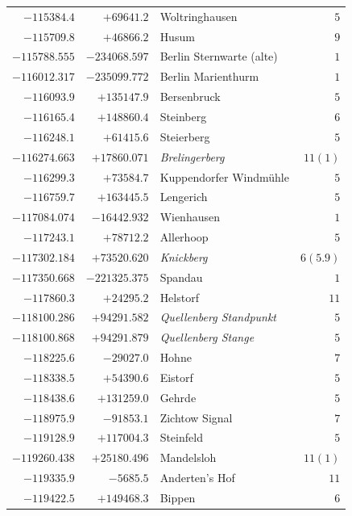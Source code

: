 \begin{center}
\begin{tabular}{r|r|p{170pt}|r}
\(-115384.4\)&\(+69641.2\)&Woltringhausen&\(5\)\\
\(-115709.8\)&\(+46866.2\)&Husum&\(9\)\\
\(-115788.555\)&\(-234068.597\)&Berlin Sternwarte (alte)&\(1\)\\
\(-116012.317\)&\(-235099.772\)&Berlin Marienthurm&\(1\)\\
\(-116093.9\)&\(+135147.9\)&Bersenbruck&\(5\)\\
\(-116165.4\)&\(+148860.4\)&Steinberg&\(6\)\\
\(-116248.1\)&\(+61415.6\)&Steierberg&\(5\)\\
\(-116274.663\)&\(+17860.071\)&\textit{Brelingerberg}&\(11 (1)\)\\
\(-116299.3\)&\(+73584.7\)&Kuppendorfer Windmühle&\(5\)\\
\(-116759.7\)&\(+163445.5\)&Lengerich&\(5\)\\
\(-117084.074\)&\(-16442.932\)&Wienhausen&\(1\)\\
\(-117243.1\)&\(+78712.2\)&Allerhoop&\(5\)\\
\(-117302.184\)&\(+73520.620\)&\textit{Knickberg}&\(6(5.9)\)\\
\(-117350.668\)&\(-221325.375\)&Spandau&\(1\)\\
\(-117860.3\)&\(+24295.2\)&Helstorf&\(11\)\\
\(-118100.286\)&\(+94291.582\)&\textit{Quellenberg Standpunkt}&\(5\)\\
\(-118100.868\)&\(+94291.879\)&\textit{Quellenberg Stange}&\(5\)\\
\(-118225.6\)&\(-29027.0\)&Hohne&\(7\)\\
\(-118338.5\)&\(+54390.6\)&Eistorf&\(5\)\\
\(-118438.6\)&\(+131259.0\)&Gehrde&\(5\)\\
\(-118975.9\)&\(-91853.1\)&Zichtow Signal&\(7\)\\
\(-119128.9\)&\(+117004.3\)&Steinfeld&\(5\)\\
\(-119260.438\)&\(+25180.496\)&Mandelsloh&\(11 (1)\)\\
\(-119335.9\)&\(-5685.5\)&Anderten’s Hof&\(11\)\\
\(-119422.5\)&\(+149468.3\)&Bippen&\(6\)\\
\hline\end{tabular}\endgroup\end{center}
\clearpage
